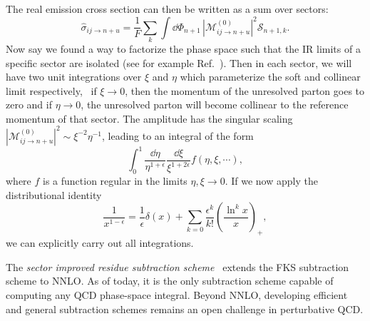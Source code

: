 The real emission cross section can then be written as a sum over sectors:
\begin{equation}
\hat{\sigma}_{ij \rightarrow n+u} = \frac{1}{F} \sum_k \int \dd \Phi_{n + 1} \, |\mathcal{M}_{ij \rightarrow n + u}^{(0)}|^2 \mathcal{S}_{n+1, k}.
\end{equation}
Now say we found a way to factorize the phase space such that the \acs{IR} limits of a specific sector are isolated (see for example Ref.~\cite{Czakon:2019tmo}). Then in each sector, we will have two unit integrations over $\xi$ and $\eta$ which parameterize the soft and collinear limit respectively, \ie\ if $\xi\rightarrow 0$, then the momentum of the unresolved parton goes to zero and if $\eta \rightarrow 0$, the unresolved parton will become collinear to the reference momentum of that sector. The amplitude has the singular scaling $|\mathcal{M}_{ij \rightarrow n + u}^{(0)}|^2 \sim \xi^{-2} \eta^{-1}$, leading to an integral of the form
\begin{equation}
\int_0^1 \frac{\dd \eta}{\eta^{1 + \epsilon}} \frac{\dd \xi}{\xi^{1 + 2 \epsilon}} f(\eta, \xi, \cdots),
\end{equation}
where $f$ is a function regular in the limits $\eta, \xi \rightarrow 0$. If we now apply the distributional identity
\begin{equation}
\frac{1}{x^{1 - \epsilon}} = \frac{1}{\epsilon} \delta (x) + \sum_{k = 0} \frac{\epsilon^k}{k!} \left( \frac{\ln^k x}{x} \right)_+,
\label{eq:2:distributional_identity}
\end{equation}
we can explicitly carry out all integrations.

The \textit{sector improved residue subtraction scheme}~\cite{Czakon:2010td, Czakon:2014oma,Czakon:2019tmo} extends the FKS subtraction scheme to \acs{NNLO}. As of today, it is the only subtraction scheme capable of computing any QCD phase-space integral. Beyond \acs{NNLO}, developing efficient and general subtraction schemes remains an open challenge in perturbative QCD.

